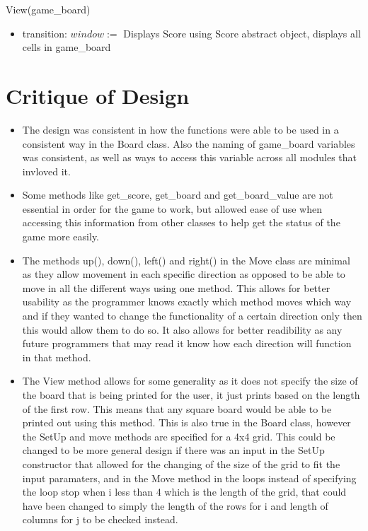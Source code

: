 \documentclass[12pt]{article}
\begin{document}
\noindent View(game\_board)

\begin{itemize}
\item transition: $\mathit{window} :=$ Displays Score using Score abstract object, displays all cells in game\_board

\end{itemize}

\newpage

\section* {Critique of Design}

\begin{itemize}

\item The design was consistent in how the functions were able to be used in a consistent way in the Board class. Also the
naming of game\_board variables was consistent, as well as ways to access this variable across all modules that invloved it.

\item Some methods like get\_score, get\_board and get\_board\_value are not essential in order for the game to work, but allowed ease of use when accessing this information from other classes to help get the status of the game more easily. 

\item The methods up(), down(), left() and right() in the Move class are minimal as they allow movement in each specific direction as opposed to be able to move in all the different ways using one method. This allows for better usability as the programmer knows exactly which method moves which way and if they wanted to change the functionality of a certain direction only then this would allow them to do so. It also allows for better readibility as any future programmers that may read it know how each direction will function in that method. 

\item The View method allows for some generality as it does not specify the size of the board that is being printed for the user, it just prints based on the length of the first row. This means that any square board would be able to be printed out using this method. This is also true in the Board class, however the SetUp and move methods are specified for a 4x4 grid. This could be changed to be more general design if there was an input in the SetUp constructor that allowed for the changing of the size of the grid to fit the input paramaters, and in the Move method in the loops instead of specifying the loop stop when i less than 4 which is the length of the grid, that could have been changed to simply the length of the rows for i and length of columns for j to be checked instead. 


\end{itemize}
\end{document}
